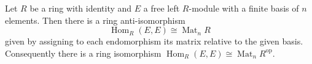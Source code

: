 Let $R$ be a ring with identity and $E$ a free left $R$-module with a finite basis of $n$ elements. Then there is a ring anti-isomorphism
\[
\operatorname{Hom}_R(E,E) \cong \operatorname{Mat}_n R
\]
given by assigning to each endomorphism its matrix relative to the given basis. Consequently there is a ring isomorphism $\operatorname{Hom}_R(E,E) \cong \operatorname{Mat}_n R^{\mathrm{op}}$.
